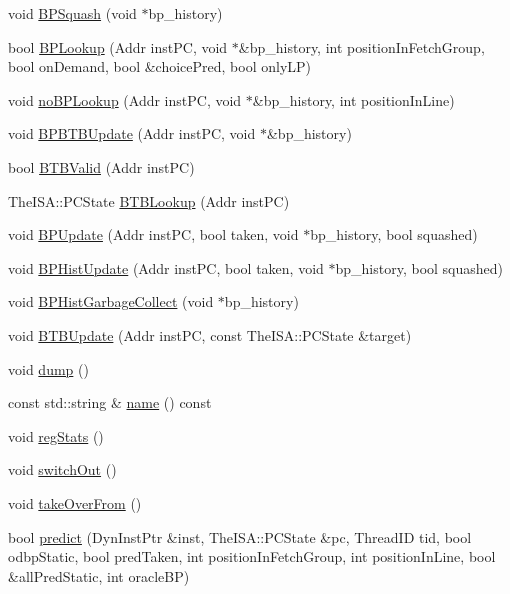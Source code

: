 \begin{DoxyCompactItemize}
void \hyperlink{classBPredUnit_a14a43c5f5bc8c64c07a075ce1608f9c3}{BPSquash} (void $\ast$bp\_\-history)
\item 
bool \hyperlink{classBPredUnit_af381979dadd608af5d4d5a235050f335}{BPLookup} (Addr instPC, void $\ast$\&bp\_\-history, int positionInFetchGroup, bool onDemand, bool \&choicePred, bool onlyLP)
\item 
void \hyperlink{classBPredUnit_af5b3e6db0cf1f00dee290e16765f28f8}{noBPLookup} (Addr instPC, void $\ast$\&bp\_\-history, int positionInLine)
\item 
void \hyperlink{classBPredUnit_a55a6608f958c4e70360c34bd48c57032}{BPBTBUpdate} (Addr instPC, void $\ast$\&bp\_\-history)
\item 
bool \hyperlink{classBPredUnit_a66a1f6f9cdd28b38b005a666a9976ed7}{BTBValid} (Addr instPC)
\item 
TheISA::PCState \hyperlink{classBPredUnit_a31024f2d92bfd7e778a790f4c6f61498}{BTBLookup} (Addr instPC)
\item 
void \hyperlink{classBPredUnit_a35c57ae0661f1d5dd2169e919741d47b}{BPUpdate} (Addr instPC, bool taken, void $\ast$bp\_\-history, bool squashed)
\item 
void \hyperlink{classBPredUnit_a16de9793a28ee07dcf26d89c03328555}{BPHistUpdate} (Addr instPC, bool taken, void $\ast$bp\_\-history, bool squashed)
\item 
void \hyperlink{classBPredUnit_a9268abcbddfdfd6e6a076ecd343a3de5}{BPHistGarbageCollect} (void $\ast$bp\_\-history)
\item 
void \hyperlink{classBPredUnit_a5afe025cde23c608d745e8daca63e8a6}{BTBUpdate} (Addr instPC, const TheISA::PCState \&target)
\item 
void \hyperlink{classBPredUnit_a6b7b489094d02552a2e1a81aab1ed280}{dump} ()
\item 
const std::string \& \hyperlink{classBPredUnit_aeaaeb15f110f0ed58cc3161d6f6ace22}{name} () const 
\item 
void \hyperlink{classBPredUnit_a0cffcea165538b2e7fd554a92b8d9b85}{regStats} ()
\item 
void \hyperlink{classBPredUnit_ac33c3d29c7b6aca9578fc416eb34e60e}{switchOut} ()
\item 
void \hyperlink{classBPredUnit_a9011bcc9143d2396dfec49828484a645}{takeOverFrom} ()
\item 
bool \hyperlink{classBPredUnit_add836c4a521ed2bd12eca4d1dee13620}{predict} (DynInstPtr \&inst, TheISA::PCState \&pc, ThreadID tid, bool odbpStatic, bool predTaken, int positionInFetchGroup, int positionInLine, bool \&allPredStatic, int oracleBP)

\end{DoxyCompactItemize}
